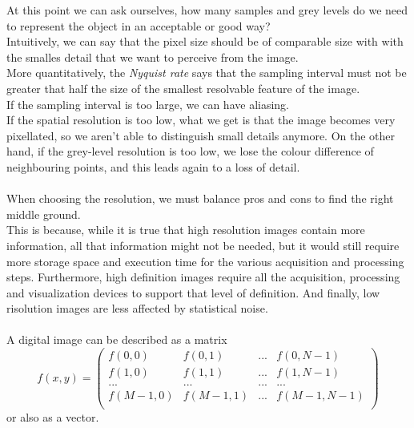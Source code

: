 At this point we can ask ourselves, how many samples and grey levels do we need to represent the object in an acceptable or good way? \\ 
Intuitively, we can say that the pixel size should be of comparable size with with the smalles detail that we want to perceive from the image. \\
More quantitatively, the \textit{Nyquist rate} says that the sampling interval must not be greater that half the size of the smallest resolvable feature of the image. \\
If the sampling interval is too large, we can have aliasing. \\
If the spatial resolution is too low, what we get is that the image becomes very pixellated, so we aren't able to distinguish small details anymore. On the other hand, if the grey-level resolution is too low, we lose the colour difference of neighbouring points, and this leads again to a loss of detail. \\ \\
When choosing the resolution, we must balance pros and cons to find the right middle ground. \\
This is because, while it is true that high resolution images contain more information, all that information might not be needed, but it would still require more storage space and execution time for the various acquisition and processing steps. Furthermore, high definition images require all the acquisition, processing and visualization devices to support that level of definition. And finally, low risolution images are less affected by statistical noise. \\ \\
A digital image can be described as a matrix 
$$
	f(x,y) = \begin{pmatrix}
		f(0,0) & f(0,1) & ... & f(0,N-1) \\
		f(1,0) & f(1,1) & ... & f(1,N-1) \\
		...    & ...    & ... & ...      \\
		f(M-1,0) & f(M-1,1) & ... & f(M-1,N-1) \\

	\end{pmatrix}
$$
or also as a vector.




